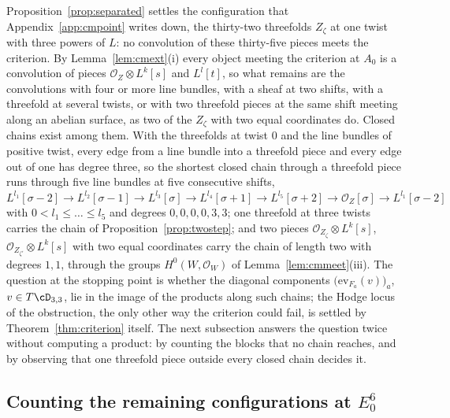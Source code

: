 Proposition~\ref{prop:separated} settles the configuration that Appendix~\ref{app:cmpoint} writes down, the thirty-two threefolds $Z_{\zeta}$ at one twist with three powers of $L$: no convolution of these thirty-five pieces meets the criterion. By Lemma~\ref{lem:cmext}(i) every object meeting the criterion at $A_{0}$ is a convolution of pieces $\mathcal{O}_{Z}\otimes L^{k}[s]$ and $L^{l}[t]$, so what remains are the convolutions with four or more line bundles, with a sheaf at two shifts, with a threefold at several twists, or with two threefold pieces at the same shift meeting along an abelian surface, as two of the $Z_{\zeta}$ with two equal coordinates do. Closed chains exist among them. With the threefolds at twist $0$ and the line bundles of positive twist, every edge from a line bundle into a threefold piece and every edge out of one has degree three, so the shortest closed chain through a threefold piece runs through five line bundles at five consecutive shifts, $L^{l_{1}}[\sigma-2]\to L^{l_{2}}[\sigma-1]\to L^{l_{3}}[\sigma]\to L^{l_{4}}[\sigma+1]\to L^{l_{5}}[\sigma+2]\to\mathcal{O}_{Z}[\sigma]\to L^{l_{1}}[\sigma-2]$ with $0<l_{1}\le\dots\le l_{5}$ and degrees $0,0,0,0,3,3$; one threefold at three twists carries the chain of Proposition~\ref{prop:twostep}; and two pieces $\mathcal{O}_{Z_{\zeta}}\otimes L^{k}[s]$, $\mathcal{O}_{Z_{\zeta'}}\otimes L^{k}[s]$ with two equal coordinates carry the chain of length two with degrees $1,1$, through the groups $H^{0}(W,\mathcal{O}_{W})$ of Lemma~\ref{lem:cmmeet}(iii). The question at the stopping point is whether the diagonal components $\bigl(\mathrm{ev}_{F_{a}}(v)\bigr)_{a}$, $v\in T\cD_{3,3}$, lie in the image of the products along such chains; the Hodge locus of the obstruction, the only other way the criterion could fail, is settled by Theorem~\ref{thm:criterion} itself. The next subsection answers the question twice without computing a product: by counting the blocks that no chain reaches, and by observing that one threefold piece outside every closed chain decides it.

\subsection{Counting the remaining configurations at $E_{0}^{6}$}\label{ssec:e06count}

